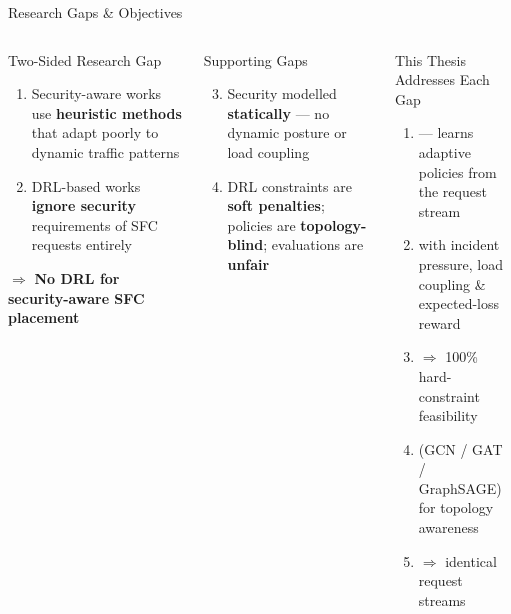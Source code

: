 \begin{frame}{Research Gaps \& Objectives}
  \begin{columns}[T]
      \begin{alertblock}{Two-Sided Research Gap}
        \footnotesize
        \begin{enumerate}
          \item Security-aware works use \textbf{heuristic methods} that adapt poorly to dynamic traffic patterns
          \item DRL-based works \textbf{ignore security} requirements of SFC requests entirely
        \end{enumerate}
        \vspace{2pt}
        \centering\small $\Rightarrow$ \textbf{No DRL for security-aware SFC placement}
      \end{alertblock}
      \vspace{4pt}
      \begin{alertblock}{Supporting Gaps}
        \footnotesize
        \begin{enumerate}\setcounter{enumi}{2}
          \item Security modelled \textbf{statically} --- no dynamic posture or load coupling
          \item DRL constraints are \textbf{soft penalties}; policies are \textbf{topology-blind}; evaluations are \textbf{unfair}
        \end{enumerate}
      \end{alertblock}
      \begin{block}{This Thesis Addresses Each Gap}
        \footnotesize
        \begin{enumerate}
          \item {} --- learns adaptive policies from the request stream
          \item {} with incident pressure, load coupling \& expected-loss reward
          \item {} $\Rightarrow$ 100\% hard-constraint feasibility
          \item {} (GCN / GAT / GraphSAGE) for topology awareness
          \item {} $\Rightarrow$ identical request streams
        \end{enumerate}
      \end{block}
  \end{columns}
\end{frame}
